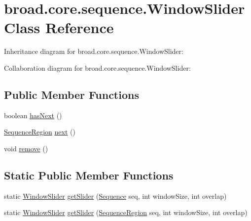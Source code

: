\hypertarget{classbroad_1_1core_1_1sequence_1_1_window_slider}{\section{broad.\+core.\+sequence.\+Window\+Slider Class Reference}
\label{classbroad_1_1core_1_1sequence_1_1_window_slider}
}


Inheritance diagram for broad.\+core.\+sequence.\+Window\+Slider\+:


Collaboration diagram for broad.\+core.\+sequence.\+Window\+Slider\+:
\subsection*{Public Member Functions}
\begin{DoxyCompactItemize}
\item 
boolean \hyperlink{classbroad_1_1core_1_1sequence_1_1_window_slider_ae50163ab05529a9d10fed39e6576e10d}{has\+Next} ()
\item 
\hyperlink{classbroad_1_1core_1_1sequence_1_1_sequence_region}{Sequence\+Region} \hyperlink{classbroad_1_1core_1_1sequence_1_1_window_slider_a7e82669fd965199515460b9fa4ac0194}{next} ()
\item 
void \hyperlink{classbroad_1_1core_1_1sequence_1_1_window_slider_a07957c88de2a56f84ff06ee985ab108f}{remove} ()
\end{DoxyCompactItemize}
\subsection*{Static Public Member Functions}
\begin{DoxyCompactItemize}
\item 
static \hyperlink{classbroad_1_1core_1_1sequence_1_1_window_slider}{Window\+Slider} \hyperlink{classbroad_1_1core_1_1sequence_1_1_window_slider_a5ede3c30c75b7d271815aa7827e55015}{get\+Slider} (\hyperlink{classbroad_1_1core_1_1sequence_1_1_sequence}{Sequence} seq, int window\+Size, int overlap)
\item 
static \hyperlink{classbroad_1_1core_1_1sequence_1_1_window_slider}{Window\+Slider} \hyperlink{classbroad_1_1core_1_1sequence_1_1_window_slider_ab81009a0ac70a08af46a0ed2f2376da1}{get\+Slider} (\hyperlink{classbroad_1_1core_1_1sequence_1_1_sequence_region}{Sequence\+Region} seq, int window\+Size, int overlap)
\end{DoxyCompactItemize}


